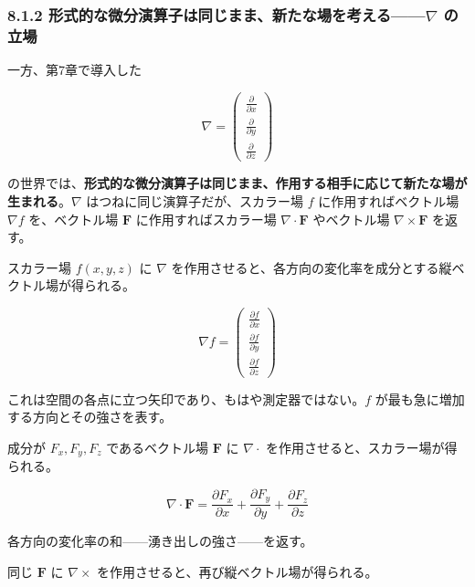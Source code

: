 \documentclass[a4paper,12pt,openany]{book}
\begin{document}
\hypertarget{ux5f62ux5f0fux7684ux306aux5faeux5206ux6f14ux7b97ux5b50ux306fux540cux3058ux307eux307eux65b0ux305fux306aux5834ux3092ux8003ux3048ux308bnabla-ux306eux7acbux5834}{%
\subsubsection{\texorpdfstring{8.1.2
形式的な微分演算子は同じまま、新たな場を考える——\(\nabla\)
の立場}{8.1.2 形式的な微分演算子は同じまま、新たな場を考える——\textbackslash nabla の立場}}\label{ux5f62ux5f0fux7684ux306aux5faeux5206ux6f14ux7b97ux5b50ux306fux540cux3058ux307eux307eux65b0ux305fux306aux5834ux3092ux8003ux3048ux308bnabla-ux306eux7acbux5834}}

一方、第7章で導入した

\[
\nabla
=
\begin{pmatrix}
\frac{\partial}{\partial x}\\[0.3em]
\frac{\partial}{\partial y}\\[0.3em]
\frac{\partial}{\partial z}
\end{pmatrix}
\]

の世界では、\textbf{形式的な微分演算子は同じまま、作用する相手に応じて新たな場が生まれる}。\(\nabla\)
はつねに同じ演算子だが、スカラー場 \(f\) に作用すればベクトル場
\(\nabla f\) を、ベクトル場 \(\mathbf{F}\) に作用すればスカラー場
\(\nabla\cdot\mathbf{F}\) やベクトル場 \(\nabla\times\mathbf{F}\)
を返す。

スカラー場 \(f(x,y,z)\) に \(\nabla\)
を作用させると、各方向の変化率を成分とする縦ベクトル場が得られる。

\[\nabla f = \begin{pmatrix} \frac{\partial f}{\partial x} \\[0.3em] \frac{\partial f}{\partial y} \\[0.3em] \frac{\partial f}{\partial z} \end{pmatrix}\]

これは空間の各点に立つ矢印であり、もはや測定器ではない。\(f\)
が最も急に増加する方向とその強さを表す。

成分が \(F_x,F_y,F_z\) であるベクトル場 \(\mathbf{F}\) に
\(\nabla\cdot\) を作用させると、スカラー場が得られる。

\[\nabla \cdot \mathbf{F} = \frac{\partial F_x}{\partial x} + \frac{\partial F_y}{\partial y} + \frac{\partial F_z}{\partial z}\]

各方向の変化率の和——湧き出しの強さ——を返す。

同じ \(\mathbf{F}\) に \(\nabla\times\)
を作用させると、再び縦ベクトル場が得られる。
\end{document}
